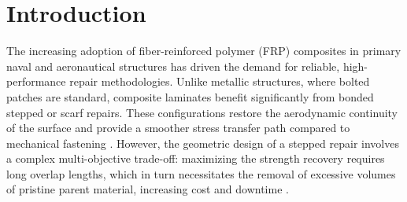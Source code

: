 \documentclass[
  preprint,
  12pt,
  a4paper
]{elsarticle}
\begin{document}




\section{Introduction}
\label{sec:intro}

The increasing adoption of fiber-reinforced polymer (FRP) composites in primary naval and aeronautical structures has driven the demand for reliable, high-performance repair methodologies. Unlike metallic structures, where bolted patches are standard, composite laminates benefit significantly from bonded stepped or scarf repairs. These configurations restore the aerodynamic continuity of the surface and provide a smoother stress transfer path compared to mechanical fastening \cite{baker1984structural, rhead2020analysis}. However, the geometric design of a stepped repair involves a complex multi-objective trade-off: maximizing the strength recovery requires long overlap lengths, which in turn necessitates the removal of excessive volumes of pristine parent material, increasing cost and downtime \cite{psarras2024design, pierce2019modelling}.
\end{document}
